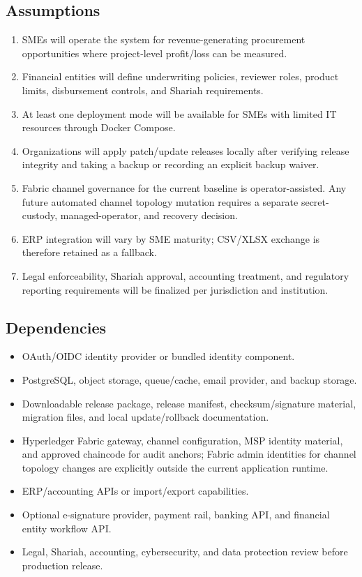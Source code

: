\documentclass[11pt,a4paper]{article}
\begin{document}
\subsection{Assumptions}
\begin{enumerate}
  \item SMEs will operate the system for revenue-generating procurement opportunities where project-level profit/loss can be measured.
  \item Financial entities will define underwriting policies, reviewer roles, product limits, disbursement controls, and Shariah requirements.
  \item At least one deployment mode will be available for SMEs with limited IT resources through Docker Compose.
  \item Organizations will apply patch/update releases locally after verifying release integrity and taking a backup or recording an explicit backup waiver.
  \item Fabric channel governance for the current baseline is operator-assisted. Any future automated channel topology mutation requires a separate secret-custody, managed-operator, and recovery decision.
  \item ERP integration will vary by SME maturity; CSV/XLSX exchange is therefore retained as a fallback.
  \item Legal enforceability, Shariah approval, accounting treatment, and regulatory reporting requirements will be finalized per jurisdiction and institution.
\end{enumerate}

\subsection{Dependencies}
\begin{itemize}
  \item OAuth/OIDC identity provider or bundled identity component.
  \item PostgreSQL, object storage, queue/cache, email provider, and backup storage.
  \item Downloadable release package, release manifest, checksum/signature material, migration files, and local update/rollback documentation.
  \item Hyperledger Fabric gateway, channel configuration, MSP identity material, and approved chaincode for audit anchors; Fabric admin identities for channel topology changes are explicitly outside the current application runtime.
  \item ERP/accounting APIs or import/export capabilities.
  \item Optional e-signature provider, payment rail, banking API, and financial entity workflow API.
  \item Legal, Shariah, accounting, cybersecurity, and data protection review before production release.
\end{itemize}
\end{document}
